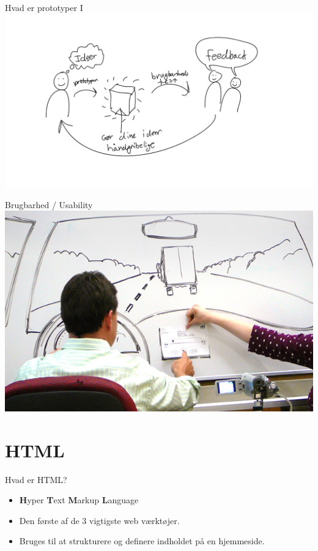 \documentclass[10pt]{beamer}
\begin{document}
\begin{frame}{Hvad er prototyper I}
	\centering
	\includegraphics[scale=0.18]{img/prototypingloop.pdf}
\end{frame}

\begin{frame}{Brugbarhed / Usability}
		\includegraphics[width=\linewidth]{img/carusability.jpg}
\end{frame}


\section{HTML}


\begin{frame}{Hvad er HTML?}
\begin{itemize}
	\item \textbf{H}yper \textbf{T}ext \textbf{M}arkup \textbf{L}anguage
	\item Den første af de 3 vigtigste web værktøjer.
	\item Bruges til at strukturere og definere indholdet på en hjemmeside.
\end{itemize}
\end{frame}
\end{document}
